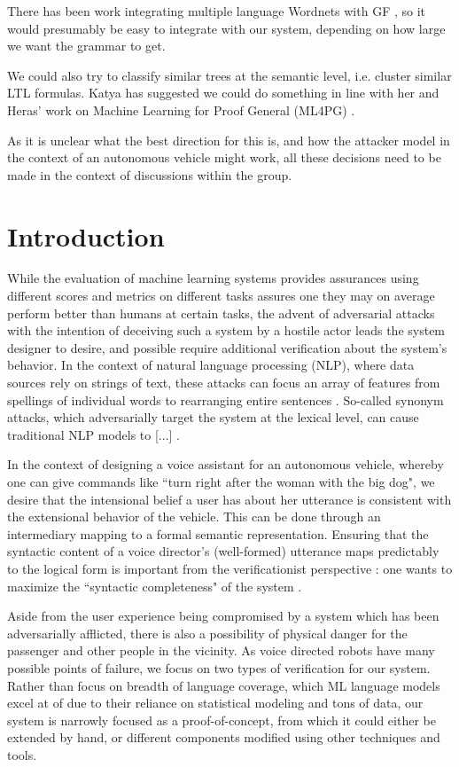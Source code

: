 \documentclass[a4paper, 11pt]{article}
\begin{document}
There has been work integrating multiple language Wordnets with GF
\cite{virk2014developing}, so it would presumably be easy to integrate with our
system, depending on how large we want the grammar to get.

We could also try to classify similar trees at the semantic level, i.e. cluster
similar LTL formulas. Katya has suggested we could do something in line with her
and Heras' work on Machine Learning for Proof General (ML4PG) \cite{ml4pg}. 

As it is unclear what the best direction for this is, and how the attacker model
in the context of an autonomous vehicle might work, all these decisions need to
be made in the context of discussions within the group.

\section{Introduction}

While the evaluation of machine learning systems provides assurances using
different scores and metrics on different tasks assures one they may on average
perform better than humans at certain tasks, the advent of adversarial attacks
\cite{szegedy} with the intention of deceiving such a system by a hostile actor
leads the system designer to desire, and possible require additional
verification about the system's behavior. In the context of natural language
processing (NLP), where data sources rely on strings of text, these attacks can
focus an array of features from spellings of individual words to rearranging
entire sentences \cite{}. So-called synonym attacks, which adversarially target
the system at the lexical level, can cause traditional NLP models to [...]
\cite{}.

In the context of designing a voice assistant for an autonomous vehicle, whereby
one can give commands like ``turn right after the woman with the big dog",
we desire that the intensional belief a user has about her utterance is
consistent with the extensional behavior of the vehicle. This can be done
through an intermediary mapping to a formal semantic representation. Ensuring
that the syntactic content of a voice director's (well-formed) utterance maps predictably to
the logical form is important from the verificationist perspective : one wants
to maximize the ``syntactic completeness" of the system \cite{macmillan2021}.

Aside from the user experience being compromised by a system which has been
adversarially afflicted, there is also a possibility of physical danger for the
passenger and other people in the vicinity. As voice directed robots have many
possible points of failure, we focus on two types of verification for our
system. Rather than focus on breadth of language coverage, which ML language
models excel at of due to their reliance on statistical modeling and tons
of data, our system is narrowly focused as a proof-of-concept, from which it
could either be extended by hand, or different components modified using
other techniques and tools.
\end{document}
